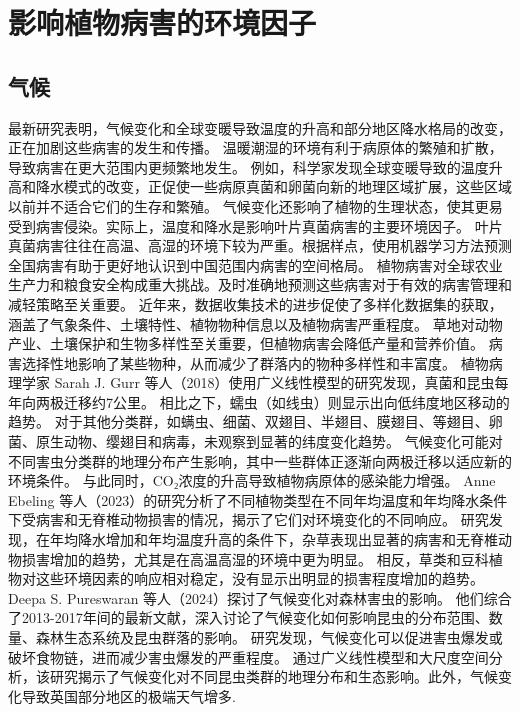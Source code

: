 \documentclass[AutoFakeBold]{LZUThesis-PgD&PhD}
\begin{document}
\section{影响植物病害的环境因子}

\subsection{气候}

最新研究表明，气候变化和全球变暖导致温度的升高和部分地区降水格局的改变，正在加剧这些病害的发生和传播。
温暖潮湿的环境有利于病原体的繁殖和扩散，导致病害在更大范围内更频繁地发生。
例如，科学家发现全球变暖导致的温度升高和降水模式的改变，正促使一些病原真菌和卵菌向新的地理区域扩展，这些区域以前并不适合它们的生存和繁殖。
气候变化还影响了植物的生理状态，使其更易受到病害侵染。实际上，温度和降水是影响叶片真菌病害的主要环境因子。
叶片真菌病害往往在高温、高湿的环境下较为严重。根据样点，使用机器学习方法预测全国病害有助于更好地认识到中国范围内病害的空间格局。
植物病害对全球农业生产力和粮食安全构成重大挑战。及时准确地预测这些病害对于有效的病害管理和减轻策略至关重要。
近年来，数据收集技术的进步促使了多样化数据集的获取，涵盖了气象条件、土壤特性、植物物种信息以及植物病害严重程度。
草地对动物产业、土壤保护和生物多样性至关重要，但植物病害会降低产量和营养价值\cite{chakraborty2018climate}。
病害选择性地影响了某些物种，从而减少了群落内的物种多样性和丰富度\cite{grunberg2023impact}。
植物病理学家 Sarah J. Gurr 等人（2018）使用广义线性模型的研究发现，真菌和昆虫每年向两极迁移约7公里。
相比之下，蠕虫（如线虫）则显示出向低纬度地区移动的趋势。
对于其他分类群，如螨虫、细菌、双翅目、半翅目、膜翅目、等翅目、卵菌、原生动物、缨翅目和病毒，未观察到显著的纬度变化趋势。
气候变化可能对不同害虫分类群的地理分布产生影响，其中一些群体正逐渐向两极迁移以适应新的环境条件。
与此同时，CO₂浓度的升高导致植物病原体的感染能力增强\cite{sukumar2018co2}。
Anne Ebeling 等人（2023）的研究分析了不同植物类型在不同年均温度和年均降水条件下受病害和无脊椎动物损害的情况，揭示了它们对环境变化的不同响应。
研究发现，在年均降水增加和年均温度升高的条件下，杂草表现出显著的病害和无脊椎动物损害增加的趋势，尤其是在高温高湿的环境中更为明显。
相反，草类和豆科植物对这些环境因素的响应相对稳定，没有显示出明显的损害程度增加的趋势\cite{ebeling2023response}。
Deepa S. Pureswaran 等人（2024）探讨了气候变化对森林害虫的影响。
他们综合了2013-2017年间的最新文献，深入讨论了气候变化如何影响昆虫的分布范围、数量、森林生态系统及昆虫群落的影响。
研究发现，气候变化可以促进害虫爆发或破坏食物链，进而减少害虫爆发的严重程度。
通过广义线性模型和大尺度空间分析，该研究揭示了气候变化对不同昆虫类群的地理分布和生态影响。此外，气候变化导致英国部分地区的极端天气增多\cite{angelotti2024forest}.
\end{document}
